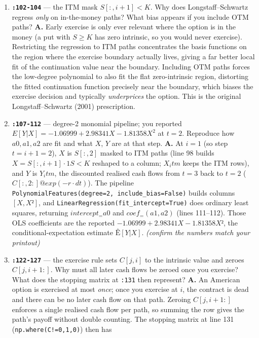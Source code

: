 \documentclass[
  11pt,
]{article}
\begin{document}
\begin{enumerate}
  inequality.) \emph{(confirm this matches your own reasoning)}
\item
  \textbf{\texttt{:102-104}} --- the ITM mask \(S[:,i+1] < K\). Why does
  Longstaff--Schwartz regress \emph{only} on in-the-money paths? What
  bias appears if you include OTM paths? \textbf{A.} Early exercise is
  only ever relevant where the option is in the money (a put with
  \(S ≥ K\) has zero intrinsic, so you would never exercise).
  Restricting the regression to ITM paths concentrates the basis
  functions on the region where the exercise boundary actually lives,
  giving a far better local fit of the continuation value near the
  boundary. Including OTM paths forces the low-degree polynomial to also
  fit the flat zero-intrinsic region, distorting the fitted continuation
  function precisely near the boundary, which biases the exercise
  decision and typically \emph{underprices} the option. This is the
  original Longstaff--Schwartz (2001) prescription.
\item
  \textbf{\texttt{:107-112}} --- degree-2 monomial pipeline; you
  reported \(E[Y|X] = -1.06999 + 2.98341 X - 1.81358 X^2\) at \(t=2\).
  Reproduce how \(a0,a1,a2\) are fit and what \(X\), \(Y\) are at that
  step. \textbf{A.} At \(i=1\) (so step \(t=i+1=2\)), \(X\) is
  \(S[:,2]\) masked to ITM paths (line 98 builds \(X = S[:,i+1]·1{S<K}\)
  reshaped to a column; \(X_itm\) keeps the ITM rows), and \(Y\) is
  \(Y_itm\), the discounted realised cash flows from \(t=3\) back to
  \(t=2\) (\(C[:,2:] @ exp(−r·dt)\)). The pipeline
  \texttt{PolynomialFeatures(degree=2,\ include\_bias=False)} builds
  columns \([X, X²]\), and
  \texttt{LinearRegression(fit\_intercept=True)} does ordinary least
  squares, returning \(intercept_ = a0\) and \(coef_ = (a1, a2)\) (lines
  111--112). Those OLS coefficients are the reported
  \(−1.06999 + 2.98341 X − 1.81358 X²\), the conditional-expectation
  estimate \(Ê[Y|X]\). \emph{(confirm the numbers match your printout)}
\item
  \textbf{\texttt{:122-127}} --- the exercise rule sets \(C[j,i]\) to
  the intrinsic value and zeroes \(C[j,i+1:]\). Why must all later cash
  flows be zeroed once you exercise? What does the stopping matrix at
  \texttt{:131} then represent? \textbf{A.} An American option is
  exercised at most \emph{once}; once you exercise at \(i\), the
  contract is dead and there can be no later cash flow on that path.
  Zeroing \(C[j,i+1:]\) enforces a single realised cash flow per path,
  so summing the row gives the path's payoff without double counting.
  The stopping matrix at line 131 (\texttt{np.where(C!=0,1,0)}) then has

\end{enumerate}
\end{document}
